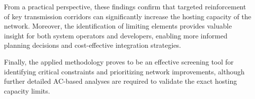 From a practical perspective, these findings confirm that targeted reinforcement of key transmission corridors can significantly increase the hosting capacity of the network. Moreover, the identification of limiting elements provides valuable insight for both system operators and developers, enabling more informed planning decisions and cost-effective integration strategies.

Finally, the applied methodology proves to be an effective screening tool for identifying critical constraints and prioritizing network improvements, although further detailed AC-based analyses are required to validate the exact hosting capacity limits.